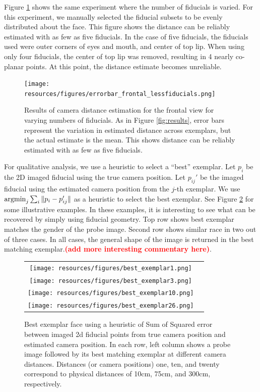 \documentclass[runningheads]{llncs}
\newcommand{\argmin}{\operatornamewithlimits{argmin}}
\newcommand {\afbnote} [1] {{\bf \textcolor{red}{(#1)}}}
\begin{document}
Figure \ref{fig:error_bar_frontal_lessfiducials} shows the same experiment where the number of fiducials is varied.  
For this experiment, we manually selected the fiducial subsets to be evenly distributed about the face.  
This figure shows the distance can be reliably estimated with as few as five fiducials.  
In the case of five fiducials, the fiducials used were outer corners of eyes and mouth, and center of top lip.
When using only four fiducials, the center of top lip was removed, resulting in 4 nearly co-planar points.
At this point, the distance estimate becomes unreliable.

\begin{figure}[h]
\centering
\texttt{[image: resources/figures/errorbar\_frontal\_lessfiducials.png]}
\caption{
Results of camera distance estimation for the frontal view for varying numbers of fiducials.
As in Figure \ref{fig:results}, error bars represent the variation in estimated distance across exemplars, but the actual estimate is the mean.
This shows distance can be reliably estimated with as few as five fiducials.
}
\label{fig:error_bar_frontal_lessfiducials}
\end{figure}

For qualitative analysis, we use a heuristic to select a ``best'' exemplar.  Let $p_i$ be the 2D imaged fiducial using the true camera position.  
Let $p_{ij}'$ be the imaged fiducial using the estimated camera position from the $j$-th exemplar.
We use $\argmin_j \sum_i \|p_i - p_{ij}'\|$ as a heuristic to select the best exemplar. 
See Figure \ref{fig:bestexemplar} for some illustrative examples.  
In these examples, it is interesting to see what can be recovered by simply using fiducial geometry.  
Top row shows best exemplar matches the gender of the probe image.  
Second row shows similar race in two out of three cases.  
In all cases, the general shape of the image is returned in the best matching exemplar.\afbnote{add more interesting commentary here}.

\begin{figure}[h]
\centering
\begin{tabular}{cc}
\texttt{[image: resources/figures/best\_exemplar1.png]} \\
\texttt{[image: resources/figures/best\_exemplar3.png]} \\
\texttt{[image: resources/figures/best\_exemplar10.png]} \\
\texttt{[image: resources/figures/best\_exemplar26.png]}
\end{tabular}
\caption{Best exemplar face using a heuristic of Sum of Squared error between imaged 2d fiducial points from true camera position and estimated camera position.  In each row, left column shows a probe image followed by its best matching exemplar at different camera distances. Distances (or camera positions) one, ten, and twenty correspond to physical distances of 10cm, 75cm, and 300cm, respectively. }
\label{fig:bestexemplar}
\end{figure}
\end{document}
